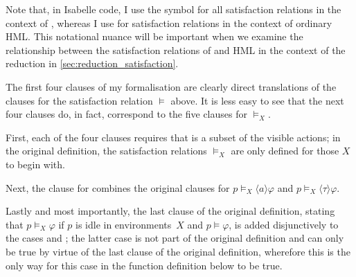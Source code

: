 \begin{isabellebody}
\begin{isamarkuptext}
Note that, in Isabelle code, I use the symbol \isa{{\isasymTTurnstile}} for all satisfaction relations in the context of \HMLt{}, whereas I use \isa{{\isasymTurnstile}} for satisfaction relations in the context of ordinary HML. 
This notational nuance will be important when we examine the relationship between the satisfaction relations of \HMLt{} and HML in the context of the reduction in \cref{sec:reduction_satisfaction}.

The first four clauses of my formalisation are clearly direct translations of the clauses for the satisfaction relation $\vDash$ above. It is less easy to see that the next four clauses do, in fact, correspond to the five clauses for $\vDash_X$. 

First, each of the four clauses requires that  is a subset of the visible actions; in the original definition, the satisfaction relations $\vDash_X$ are only defined for those $X$ to begin with.

Next, the clause for  combines the original clauses for $p \vDash_X \langle a \rangle \varphi$ and $p \vDash_X \langle \tau \rangle \varphi$. 

Lastly and most importantly, the last clause of the original definition, stating that $p \vDash_X \varphi$ if $p$ is idle in environments~$X$ and $p \vDash \varphi$, is added disjunctively to the cases  and ; the latter case is not part of the original definition and can only be true by virtue of the last clause of the original definition, wherefore this is the only way for this case in the function definition below to be true. 


\end{isamarkuptext}
\end{isabellebody}
